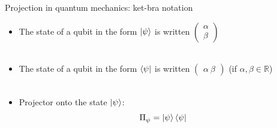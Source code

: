 \documentclass[aspectratio=169,12pt]{beamer}
\begin{document}
\begin{frame}{Projection in quantum mechanics: ket-bra notation}
  \begin{itemize}[<+->]
    \setlength{\itemsep}{0.6em}
    \item The state of a qubit in the form $\ket \psi$ is written $\begin{pmatrix}
    \alpha\\ \beta \end{pmatrix}$ \\~\\
    \item The state of a qubit in the form $\bra \psi$ is written $\begin{pmatrix}
    \alpha \ \beta \end{pmatrix}$ (if $\alpha, \beta \in \mathbb R$) \\~\\
    \item Projector onto the state $\ket \psi$: $$\Pi_\psi^{} = \ket \psi \bra \psi$$ 
  \end{itemize}
\end{frame}
\end{document}
